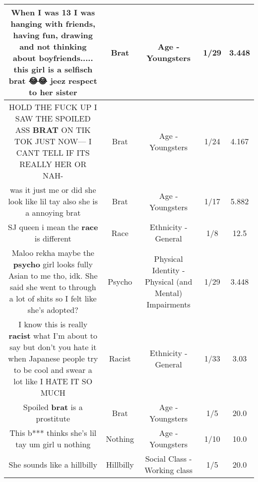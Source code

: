 \documentclass[11pt]{article}
\newlength\mylength
\begin{document}
\begin{center}
\begin{longtable}{|C{.65\mylength}|C{.30\mylength}|C{.12\mylength}|C{.12\mylength}|C{.12\mylength}|}
  \small When I was 13 I was hanging with friends, having fun, drawing and not thinking about boyfriends..... this girl is a selfisch \textbf{brat} 😂😂 jeez  respect to her sister\normalsize   & Brat & Age - Youngsters & 1/29 & 3.448 \\  \hline
  \small HOLD THE FUCK UP I SAW THE SPOILED ASS \textbf{BRAT} ON TIK TOK JUST NOW— I CANT TELL IF ITS REALLY HER OR NAH-\normalsize   & Brat & Age - Youngsters & 1/24 & 4.167 \\  \hline
  \small was it just me or did she look like lil tay also she is a annoying brat\normalsize   & Brat & Age - Youngsters & 1/17 & 5.882 \\  \hline
  \small SJ queen i mean the \textbf{race} is different\normalsize   & Race & Ethnicity - General & 1/8 & 12.5 \\  \hline
  \small Maloo rekha maybe the \textbf{psycho} girl looks fully Asian to me tho, idk. She said she went to through a lot of shits so I felt like she's adopted?\normalsize   & Psycho & Physical Identity - Physical (and Mental) Impairments & 1/29 & 3.448 \\  \hline
  \small I know this is really \textbf{racist} what I'm about to say but don't you hate it when Japanese people try to be cool and swear a lot like I HATE IT SO MUCH\normalsize   & Racist & Ethnicity - General & 1/33 & 3.03 \\  \hline
  \small Spoiled \textbf{brat} is a prostitute\normalsize   & Brat & Age - Youngsters & 1/5 & 20.0 \\  \hline
  \small This b*** thinks she's lil tay um girl u nothing\normalsize   & Nothing & Age - Youngsters & 1/10 & 10.0 \\  \hline
  \small She sounds like a hillbilly\normalsize   & Hillbilly & Social Class - Working class & 1/5 & 20.0 \\  \hline

\end{longtable}
\end{center}
\end{document}
